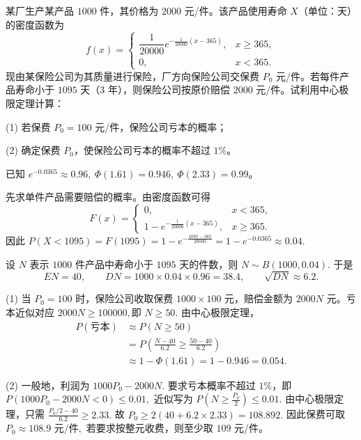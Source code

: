 \documentclass[lang=cn,11pt]{elegantbook}
\begin{document}
\begin{exercise}\label{exer:src-2008-probstat-2a-vi-01}\label{exer:src-paper3-iv-04}\label{prob:p3-iv-04}
某厂生产某产品 \(1000\) 件，其价格为 \(2000\) 元/件。该产品使用寿命 \(X\)（单位：天）的密度函数为
\[
f(x)=
\begin{cases}
\dfrac1{20000}e^{-\frac1{20000}(x-365)},&x\ge365,\\
0,&x<365.
\end{cases}
\]
现由某保险公司为其质量进行保险，厂方向保险公司交保费 \(P_0\) 元/件。若每件产品寿命小于 \(1095\) 天（3 年），则保险公司按原价赔偿 \(2000\) 元/件。试利用中心极限定理计算：\par
(1) 若保费 \(P_0=100\) 元/件，保险公司亏本的概率；\par
(2) 确定保费 \(P_0\)，使保险公司亏本的概率不超过 \(1\%\)。\par
已知 \(e^{-0.0365}\approx0.96,\ \Phi(1.61)=0.946,\ \Phi(2.33)=0.99\)。
\end{exercise}
\begin{solution}
先求单件产品需要赔偿的概率。由密度函数可得
\[
F(x)=
\begin{cases}
0,&x<365,\\
1-e^{-\frac1{20000}(x-365)},&x\ge365.
\end{cases}
\]
因此
\(
P(X<1095)=F(1095)=1-e^{-\frac{1095-365}{20000}}
=1-e^{-0.0365}\approx0.04.
\)

设 \(N\) 表示 \(1000\) 件产品中寿命小于 \(1095\) 天的件数，则
\(
N\sim B(1000,0.04).
\)
于是
\[
EN=40,\qquad DN=1000\times0.04\times0.96=38.4,\qquad \sqrt{DN}\approx6.2.
\]

(1) 当 \(P_0=100\) 时，保险公司收取保费 \(1000\times100\) 元，赔偿金额为 \(2000N\) 元。亏本近似对应
\(
2000N\ge100000,\text{即 }N\ge50.
\)
由中心极限定理，
\[
\begin{aligned}
P(\text{亏本})
&\approx P(N\ge50)\\
&=P\left(\frac{N-40}{6.2}\ge\frac{50-40}{6.2}\right)\\
&\approx1-\Phi(1.61)
=1-0.946
=0.054.
\end{aligned}
\]

(2) 一般地，利润为
\(
1000P_0-2000N.
\)
要求亏本概率不超过 \(1\%\)，即
\(
P(1000P_0-2000N<0)\le0.01,
\)
近似写为
\(
P\left(N\ge\frac{P_0}{2}\right)\le0.01.
\)
由中心极限定理，只需
\(
\frac{P_0/2-40}{6.2}\ge2.33.
\)
故
\(
P_0\ge2(40+6.2\times2.33)=108.892.
\)
因此保费可取
\(
P_0\approx108.9\text{ 元/件},
\)
若要求按整元收费，则至少取 \(109\) 元/件。
\end{solution}
\end{document}
